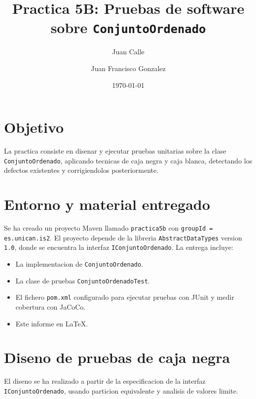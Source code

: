 \documentclass[11pt,a4paper]{article}
\title{Practica 5B: Pruebas de software sobre \texttt{ConjuntoOrdenado}}
\author{Juan Calle \and Juan Francisco Gonzalez}
\date{\today}
\begin{document}
\maketitle

\section{Objetivo}
La practica consiste en disenar y ejecutar pruebas unitarias sobre la clase \texttt{ConjuntoOrdenado}, aplicando tecnicas de caja negra y caja blanca, detectando los defectos existentes y corrigiendolos posteriormente.

\section{Entorno y material entregado}
Se ha creado un proyecto Maven llamado \texttt{practica5b} con \texttt{groupId = es.unican.is2}. El proyecto depende de la libreria \texttt{AbstractDataTypes} version \texttt{1.0}, donde se encuentra la interfaz \texttt{IConjuntoOrdenado}. La entrega incluye:
\begin{itemize}
\item La implementacion de \texttt{ConjuntoOrdenado}.
\item La clase de pruebas \texttt{ConjuntoOrdenadoTest}.
\item El fichero \texttt{pom.xml} configurado para ejecutar pruebas con JUnit y medir cobertura con JaCoCo.
\item Este informe en \LaTeX.
\end{itemize}

\section{Diseno de pruebas de caja negra}
El diseno se ha realizado a partir de la especificacion de la interfaz \texttt{IConjuntoOrdenado}, usando particion equivalente y analisis de valores limite.
\end{document}
